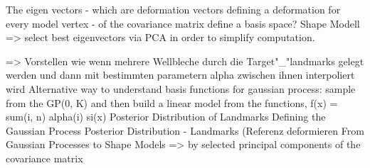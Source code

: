 The eigen vectors - which are deformation vectors defining a deformation for every model vertex - of the covariance matrix define a basis space? 
Shape Modell => select best eigenvectors via PCA in order to simplify computation.

=> Vorstellen wie wenn mehrere Wellbleche durch die Target"\_"landmarks gelegt werden und dann mit bestimmten parametern alpha zwischen ihnen interpoliert wird
Alternative way to understand basis functions for gaussian process:
sample from the GP(0, K)
and then build a linear model from the functions, f(x) = sum(i, n) alpha(i) si(x)
Posterior Distribution of Landmarks
Defining the Gaussian Process
Posterior Distribution - Landmarks (Referenz deformieren 
From Gaussian Processes to Shape Models => by selected principal components of the covariance matrix


